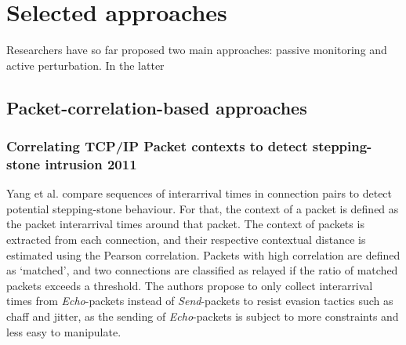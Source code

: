 \documentclass[conference]{IEEEtran}\usepackage[]{graphicx}\usepackage[]{color}
\begin{document}
 





\section{Selected approaches}

Researchers have so far proposed two main approaches: passive monitoring and active perturbation. In the latter

\subsection{Packet-correlation-based approaches}





\subsubsection{Correlating TCP/IP Packet contexts to detect stepping-stone intrusion 2011}

Yang et al. \cite{yang2011correlating} compare sequences of interarrival times in connection pairs to detect potential stepping-stone behaviour. For that, the context of a packet is defined as the packet interarrival times around that packet. The context of  packets is extracted from each connection, and their respective contextual distance is estimated using the Pearson correlation. Packets with high correlation are defined as `matched', and two connections are classified as relayed if the ratio of matched packets exceeds a threshold. The authors propose to only collect interarrival times from \textit{Echo}-packets instead of \textit{Send}-packets to resist evasion tactics such as chaff and jitter, as the sending of \textit{Echo}-packets is subject to more constraints and less easy to manipulate.
\end{document}
